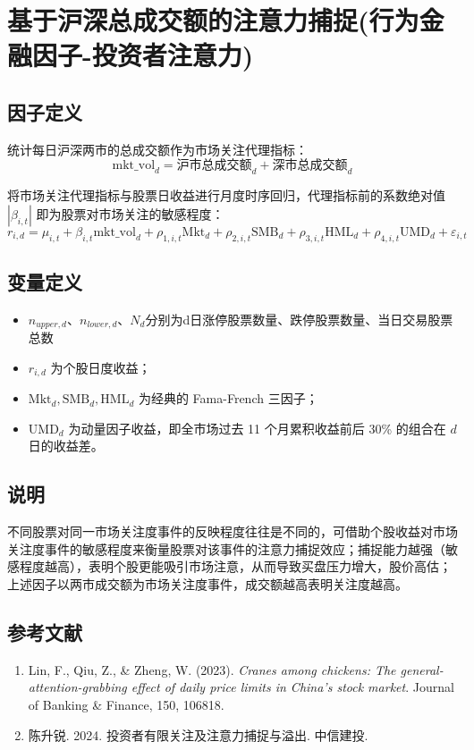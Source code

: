 \documentclass{article}
\begin{document}
\section{基于沪深总成交额的注意力捕捉(行为金融因子-投资者注意力)}

\subsection{因子定义}

统计每日沪深两市的总成交额作为市场关注代理指标：
\begin{equation}
    \mathrm{mkt\_vol}_d = \text{沪市总成交额}_d + \text{深市总成交额}_d
\end{equation}

将市场关注代理指标与股票日收益进行月度时序回归，代理指标前的系数绝对值 \( |\beta_{i,t}| \) 即为股票对市场关注的敏感程度：
\begin{equation}
    r_{i,d} = \mu_{i,t} + \beta_{i,t} \mathrm{mkt\_vol}_d + \rho_{1,i,t} \mathrm{Mkt}_d + \rho_{2,i,t} \mathrm{SMB}_d + \rho_{3,i,t} \mathrm{HML}_d + \rho_{4,i,t} \mathrm{UMD}_d + \varepsilon_{i,t}
\end{equation}

\subsection{变量定义}
\begin{itemize}
    \item  \( n_{upper,d}、n_{lower,d}、N_d\)分别为d日涨停股票数量、跌停股票数量、当日交易股票总数
    \item  \( r_{i,d} \) 为个股日度收益；
    \item  \( \mathrm{Mkt}_d, \mathrm{SMB}_d, \mathrm{HML}_d \) 为经典的 Fama-French 三因子；
    \item  \( \mathrm{UMD}_d \) 为动量因子收益，即全市场过去 11 个月累积收益前后 30\% 的组合在 \( d \) 日的收益差。
\end{itemize}

\subsection{说明}
不同股票对同一市场关注度事件的反映程度往往是不同的，可借助个股收益对市场关注度事件的敏感程度来衡量股票对该事件的注意力捕捉效应；捕捉能力越强（敏感程度越高），表明个股更能吸引市场注意，从而导致买盘压力增大，股价高估；上述因子以两市成交额为市场关注度事件，成交额越高表明关注度越高。

\subsection{参考文献}
\begin{enumerate}
    \item Lin, F., Qiu, Z., \& Zheng, W. (2023). \textit{Cranes among chickens: The general-attention-grabbing effect of daily price limits in China's stock market}. Journal of Banking \& Finance, 150, 106818.
    \item 陈升锐. 2024. 投资者有限关注及注意力捕捉与溢出. 中信建投.
\end{enumerate}
\end{document}

